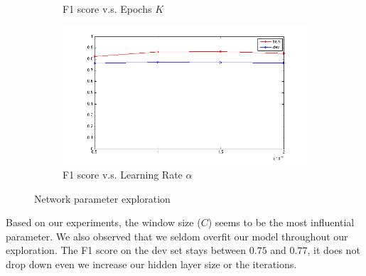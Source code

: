\documentclass[letterpaper]{article}
\begin{document}
\begin{figure}[ht]
\begin{subfigure}{.5\textwidth}
  \caption{F1 score v.s. Epochs $K$}
  \label{fig:epoch}
\end{subfigure}%
\begin{subfigure}{.5\textwidth}
  \includegraphics[scale=0.5, width=1.0\linewidth]{alpha.png}
  \caption{F1 score v.s. Learning Rate $\alpha$}
  \label{fig:alpha}
\end{subfigure}
\caption{Network parameter exploration}
\label{fig:exploration}
\end{figure}
Based on our experiments, the window size ($C$) seems to be the most influential parameter. We also observed that we seldom overfit our model throughout our exploration. The F1 score on the dev set stays between $0.75$ and $0.77$, it does not drop down even we increase our hidden layer size or the iterations.
\end{document}
